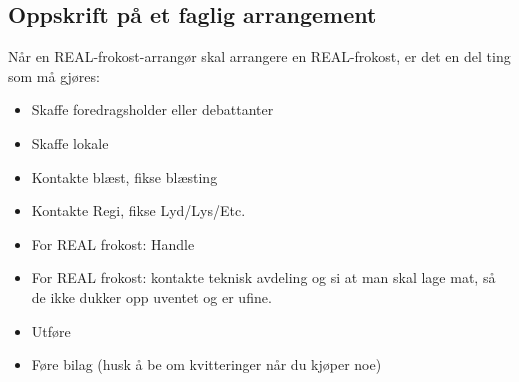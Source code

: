 \subsection{Oppskrift på et faglig arrangement}
\label{fagstyret:sec:REALfrokost-oppskrift}
Når en REAL-frokost-arrangør skal arrangere en REAL-frokost, er det en del
ting som må gjøres:
\begin{itemize}
    \item Skaffe foredragsholder eller debattanter
    \item Skaffe lokale
    \item Kontakte blæst, fikse blæsting
    \item Kontakte Regi, fikse Lyd/Lys/Etc.
    \item For REAL frokost: Handle
    \item For REAL frokost: kontakte teknisk avdeling og si at man skal
          lage mat, så de ikke dukker opp uventet og er ufine.
    \item Utføre
    \item Føre bilag (husk å be om kvitteringer når du kjøper noe)
\end{itemize}
